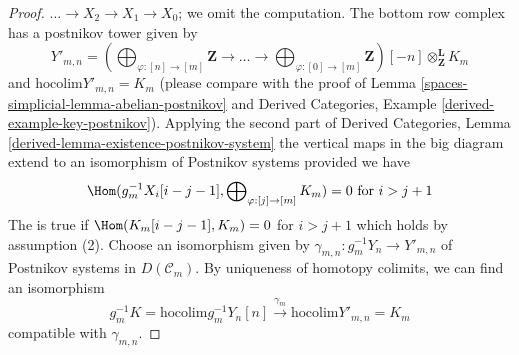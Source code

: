 \begin{proof}
$\ldots \to X_2 \to X_1 \to X_0$; we omit the computation.
The bottom row complex has a postnikov tower given by
$$
Y'_{m, n} =
\left(\bigoplus\nolimits_{\varphi : [n] \to [m]} \mathbf{Z} \to
\ldots \to
\bigoplus\nolimits_{\varphi : [0] \to [m]} \mathbf{Z}\right)[-n]
\otimes^\mathbf{L}_\mathbf{Z} K_m
$$
and $\text{hocolim} Y'_{m, n} = K_m$
(please compare with the proof of Lemma \ref{spaces-simplicial-lemma-abelian-postnikov}
and Derived Categories, Example \ref{derived-example-key-postnikov}).
Applying the second part of
Derived Categories, Lemma \ref{derived-lemma-existence-postnikov-system}
the vertical maps in the big diagram extend to an isomorphism
of Postnikov systems provided we have
$$
\Hom(g_m^{-1}X_i[i - j - 1], \bigoplus\nolimits_{\varphi : [j] \to [m]} K_m)
= 0\text{ for }i > j + 1
$$
The is true if $\Hom(K_m[i - j - 1], K_m) = 0$ for $i > j + 1$
which holds by assumption (2). Choose an isomorphism given
by $\gamma_{m, n} : g_m^{-1}Y_n \to Y'_{m, n}$ of Postnikov systems
in $D(\mathcal{C}_m)$. By uniqueness of homotopy colimits,
we can find an isomorphism
$$
g_m^{-1} K = \text{hocolim} g_m^{-1}Y_n[n]
\xrightarrow{\gamma_m}
\text{hocolim} Y'_{m, n} = K_m
$$
compatible with $\gamma_{m, n}$.


\end{proof}
